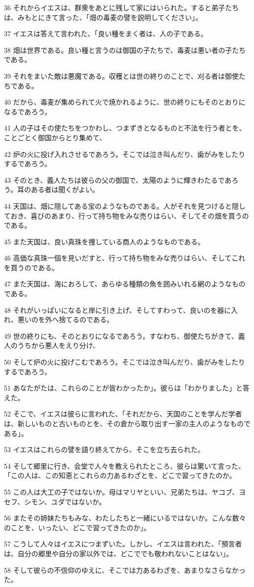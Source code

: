 \par 36 それからイエスは、群衆をあとに残して家にはいられた。すると弟子たちは、みもとにきて言った、「畑の毒麦の譬を説明してください」。
\par 37 イエスは答えて言われた、「良い種をまく者は、人の子である。
\par 38 畑は世界である。良い種と言うのは御国の子たちで、毒麦は悪い者の子たちである。
\par 39 それをまいた敵は悪魔である。収穫とは世の終りのことで、刈る者は御使たちである。
\par 40 だから、毒麦が集められて火で焼かれるように、世の終りにもそのとおりになるであろう。
\par 41 人の子はその使たちをつかわし、つまずきとなるものと不法を行う者とを、ことごとく御国からとり集めて、
\par 42 炉の火に投げ入れさせるであろう。そこでは泣き叫んだり、歯がみをしたりするであろう。
\par 43 そのとき、義人たちは彼らの父の御国で、太陽のように輝きわたるであろう。耳のある者は聞くがよい。
\par 44 天国は、畑に隠してある宝のようなものである。人がそれを見つけると隠しておき、喜びのあまり、行って持ち物をみな売りはらい、そしてその畑を買うのである。
\par 45 また天国は、良い真珠を捜している商人のようなものである。
\par 46 高価な真珠一個を見いだすと、行って持ち物をみな売りはらい、そしてこれを買うのである。
\par 47 また天国は、海におろして、あらゆる種類の魚を囲みいれる網のようなものである。
\par 48 それがいっぱいになると岸に引き上げ、そしてすわって、良いのを器に入れ、悪いのを外へ捨てるのである。
\par 49 世の終りにも、そのとおりになるであろう。すなわち、御使たちがきて、義人のうちから悪人をえり分け、
\par 50 そして炉の火に投げこむであろう。そこでは泣き叫んだり、歯がみをしたりするであろう。
\par 51 あなたがたは、これらのことが皆わかったか」。彼らは「わかりました」と答えた。
\par 52 そこで、イエスは彼らに言われた、「それだから、天国のことを学んだ学者は、新しいものと古いものとを、その倉から取り出す一家の主人のようなものである」。
\par 53 イエスはこれらの譬を語り終えてから、そこを立ち去られた。
\par 54 そして郷里に行き、会堂で人々を教えられたところ、彼らは驚いて言った、「この人は、この知恵とこれらの力あるわざとを、どこで習ってきたのか。
\par 55 この人は大工の子ではないか。母はマリヤといい、兄弟たちは、ヤコブ、ヨセフ、シモン、ユダではないか。
\par 56 またその姉妹たちもみな、わたしたちと一緒にいるではないか。こんな数々のことを、いったい、どこで習ってきたのか」。
\par 57 こうして人々はイエスにつまずいた。しかし、イエスは言われた、「預言者は、自分の郷里や自分の家以外では、どこででも敬われないことはない」。
\par 58 そして彼らの不信仰のゆえに、そこでは力あるわざを、あまりなさらなかった。


